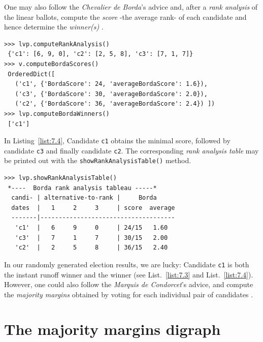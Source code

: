 One may also follow the \emph{Chevalier de Borda}'s advice and, after a \emph{rank analysis} of the linear ballots, compute the \Borda \emph{score} -the average rank- of each candidate and hence determine the \Borda \emph{winner(s)} \citep{BOR-1781}.
\begin{lstlisting}[caption={Example of \Borda rank scores},label=list:7.4]
>>> lvp.computeRankAnalysis()
 {'c1': [6, 9, 0], 'c2': [2, 5, 8], 'c3': [7, 1, 7]}
>>> v.computeBordaScores()
 OrderedDict([
   ('c1', {'BordaScore': 24, 'averageBordaScore': 1.6}),
   ('c3', {'BordaScore': 30, 'averageBordaScore': 2.0}),
   ('c2', {'BordaScore': 36, 'averageBordaScore': 2.4}) ])
>>> lvp.computeBordaWinners()
 ['c1']
\end{lstlisting}

In  Listing~\vref{list:7.4}, Candidate \texttt{c1} obtains the minimal \Borda score, followed by candidate \texttt{c3} and finally candidate \texttt{c2}. The corresponding \Borda \emph{rank analysis table} may be printed out with the \texttt{showRankAnalysisTable()} method.
\begin{lstlisting}[caption={Rank analysis example with \Borda scores},label=list:7.5]
>>> lvp.showRankAnalysisTable()
 *----  Borda rank analysis tableau -----*
  candi- | alternative-to-rank |     Borda 
  dates  |   1     2     3     | score  average
  -------|-------------------------------------
   'c1'  |   6     9     0     | 24/15   1.60
   'c3'  |   7     1     7     | 30/15   2.00
   'c2'  |   2     5     8     | 36/15   2.40
 \end{lstlisting}

In our randomly generated election results, we are lucky: Candidate \texttt{c1} is both the instant runoff winner and the \Borda winner (see List.~\vref{list:7.3} and List.~\ref{list:7.4}). However, one could also follow the \emph{Marquis de Condorcet}'s advice, and compute the \emph{majority margins} obtained by voting for each individual pair of candidates \citep{CON-1784}.

\section{The majority margins digraph}
\label{sec:7.3}

